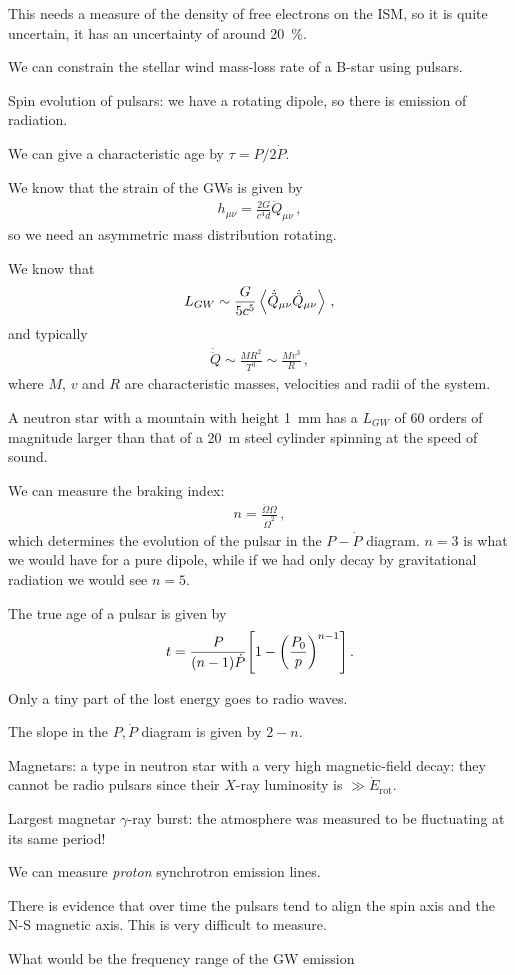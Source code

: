 \documentclass[main.tex]{subfiles}
\begin{document}
This needs a measure of the density of free electrons on the ISM, so it is quite uncertain, it has an uncertainty of around \SI{20}{\percent}.

We can constrain the stellar wind mass-loss rate of a B-star using pulsars. 


Spin evolution of pulsars: we have a rotating dipole, so there is emission of radiation. 

We can give a characteristic age by \(\tau = P / 2 \dot{P}\). 

We know that the strain of the GWs is given by 
%
\begin{align}
h_{\mu \nu } = \frac{2G}{c^{4}d} \ddot{Q}_{\mu \nu }
\,,
\end{align}
%
so we need an asymmetric mass distribution rotating. 

We know that 
%
\begin{align}
L_{GW} \sim \frac{G}{5c^{5} } \expval{\dot{\ddot{Q}}_{\mu \nu } \dot{\ddot{Q}}_{\mu \nu }}
\,,
\end{align}
%
and typically 
%
\begin{align}
\dot{\ddot{Q}} \sim \frac{MR^2}{T^3} \sim \frac{M v^3}{R}
\,,
\end{align}
%
where \(M\), \(v\) and \(R\) are characteristic masses, velocities and radii of the system. 

A neutron star with a mountain with height \SI{1}{mm} has a \(L_{GW}\) of 60 orders of magnitude larger than that of a \SI{20}{m} steel cylinder spinning at the speed of sound.

We can measure the braking index: 
%
\begin{align}
n = \frac{\ddot{\Omega} \Omega }{\dot{\Omega}^2}
\,,
\end{align}
%
which determines the evolution of the pulsar in the \(P - \dot{P}\) diagram. \(n=3\) is what we would have for a pure dipole, while if we had only decay by gravitational radiation we would see \(n=5\). 

The true age of a pulsar is given by 
%
\begin{align}
t = \frac{P}{(n-1) \dot{P}} \qty[1 - \qty(\frac{P_0 }{p})^{n-1}]
\,.
\end{align}

Only a tiny part of the lost energy goes to radio waves. 

The slope in the \(P, \dot{P}\) diagram is given by \(2-n\). 

Magnetars: a type in neutron star with a very high magnetic-field decay: they cannot be radio pulsars since their \(X\)-ray luminosity is \(\gg \dot{E} _{\text{rot}}\). 

Largest magnetar \(\gamma \)-ray burst: the atmosphere was measured to be fluctuating at its same period! 

We can measure \emph{proton} synchrotron emission lines. 

There is evidence that over time the pulsars tend to align the spin axis and the N-S magnetic axis. 
This is very difficult to measure. 

What would be the frequency range of the GW emission 
\end{document}
